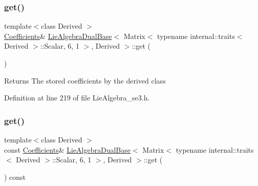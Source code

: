 \subsubsection{\texorpdfstring{get()}{get()}\hspace{0.1cm}{\footnotesize\ttfamily [1/2]}}
{\footnotesize\ttfamily template$<$class Derived $>$ \\
\hyperlink{class_lie_algebra_dual_base_3_01_matrix_3_01typename_01internal_1_1traits_3_01_derived_01_4_1_1_7557dc73cbfcbc32e399b9855a977d47_ac1756a8985eb67fcece03a1d4ac61111}{Coefficients}\& \hyperlink{class_lie_algebra_dual_base}{Lie\+Algebra\+Dual\+Base}$<$ Matrix$<$ typename internal\+::traits$<$ Derived $>$\+::Scalar, 6, 1 $>$, Derived $>$\+::get (\begin{DoxyParamCaption}{ }\end{DoxyParamCaption})\hspace{0.3cm}{\ttfamily [inline]}}

\begin{DoxyReturn}{Returns}
The stored coefficients by the derived class 
\end{DoxyReturn}


Definition at line 219 of file Lie\+Algebra\+\_\+se3.\+h.

\hypertarget{class_lie_algebra_dual_base_3_01_matrix_3_01typename_01internal_1_1traits_3_01_derived_01_4_1_1_7557dc73cbfcbc32e399b9855a977d47_a476e5cee196fd72c7107203b50af1e69}{}\label{class_lie_algebra_dual_base_3_01_matrix_3_01typename_01internal_1_1traits_3_01_derived_01_4_1_1_7557dc73cbfcbc32e399b9855a977d47_a476e5cee196fd72c7107203b50af1e69} 
\subsubsection{\texorpdfstring{get()}{get()}\hspace{0.1cm}{\footnotesize\ttfamily [2/2]}}
{\footnotesize\ttfamily template$<$class Derived $>$ \\
const \hyperlink{class_lie_algebra_dual_base_3_01_matrix_3_01typename_01internal_1_1traits_3_01_derived_01_4_1_1_7557dc73cbfcbc32e399b9855a977d47_ac1756a8985eb67fcece03a1d4ac61111}{Coefficients}\& \hyperlink{class_lie_algebra_dual_base}{Lie\+Algebra\+Dual\+Base}$<$ Matrix$<$ typename internal\+::traits$<$ Derived $>$\+::Scalar, 6, 1 $>$, Derived $>$\+::get (\begin{DoxyParamCaption}{ }\end{DoxyParamCaption}) const\hspace{0.3cm}{\ttfamily [inline]}}

